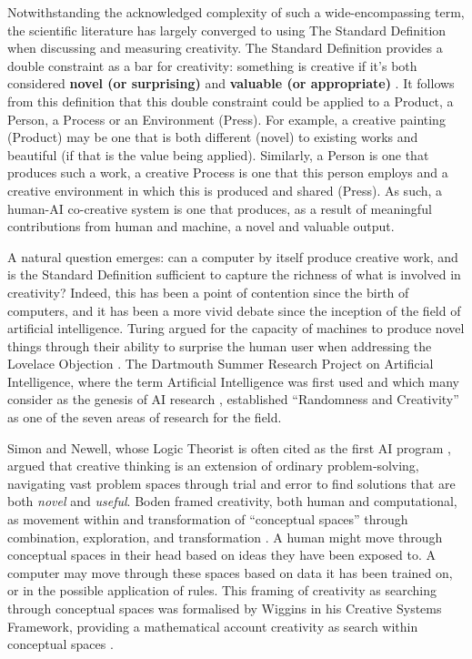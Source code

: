Notwithstanding the acknowledged complexity of such a wide-encompassing term, the scientific literature has largely converged to using The Standard Definition when discussing and measuring creativity. The Standard Definition provides a double constraint as a bar for creativity: something is creative if it's both considered \textbf{novel (or surprising)} and \textbf{valuable (or appropriate)} \cite{Amabile1983-lj, Sternberg1998-oz, Runco2012-mk, Boden2003-hk}. It follows from this definition that this double constraint could be applied to a Product, a Person, a Process or an Environment (Press). For example, a creative painting (Product) may be one that is both different (novel) to existing works and beautiful (if that is the value being applied). Similarly, a Person is one that produces such a work, a creative Process is one that this person employs and a creative environment in which this is produced and shared (Press). As such, a human-AI co-creative system is one that produces, as a result of meaningful contributions from human and machine, a novel and valuable output. 

A natural question emerges: can a computer by itself produce creative work, and is the Standard Definition sufficient to capture the richness of what is involved in creativity? Indeed, this has been a point of contention since the birth of computers, and it has been a more vivid debate since the inception of the field of artificial intelligence. Turing argued for the capacity of machines to produce novel things through their ability to surprise the human user when addressing the Lovelace Objection \cite{Turing1950-aq}. The Dartmouth Summer Research Project on Artificial Intelligence, where the term Artificial Intelligence was first used and which many consider as the genesis of AI research \cite{McCarthy1955-ls}, established “Randomness and Creativity” as one of the seven areas of research for the field. 

Simon and Newell, whose Logic Theorist is often cited as the first AI program \cite{Russell2016-oe}, argued that creative thinking is an extension of ordinary problem‑solving, navigating vast problem spaces through trial and error to find solutions that are both \textit{novel} and \textit{useful}\cite{Simon1967-nr}. Boden framed creativity, both human and computational, as movement within and transformation of “conceptual spaces” through combination, exploration, and transformation \cite{Boden2003-hk}. A human might move through conceptual spaces in their head based on ideas they have been exposed to. A computer may move through these spaces based on data it has been trained on, or in the possible application of rules. This framing of creativity as searching through conceptual spaces was formalised by Wiggins in his Creative Systems Framework, providing a mathematical account creativity as search within conceptual spaces  \cite{Wiggins2006-zd}.

